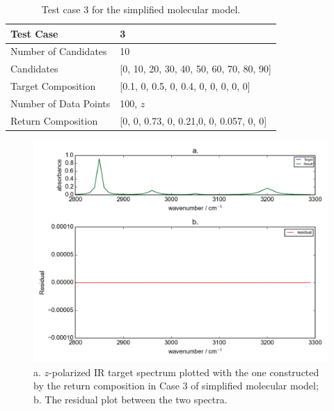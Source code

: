 \begin{table}[ht!]
\begin{center}
\begin{tabular}{| l | p{7cm} | }
\hline
Test Case & 3  \\
\hline
Number of Candidates & 10   \\
\hline
Candidates & [0, 10, 20, 30, 40, 50, 60, 70, 80, 90]  \\
\hline
Target Composition & [0.1, 0, 0.5, 0, 0.4, 0, 0, 0, 0, 0] \\
\hline
Number of Data Points & 100, $z$ \\
\hline
Return Composition & [0, 0, 0.73, 0, 0.21,0, 0, 0.057, 0, 0] \\
\hline
\end{tabular}
\end{center}
\caption{Test case 3 for the simplified molecular model.}
\label{tab:3.2}
\end{table}	

\begin{figure}[!ht] 
\centering
\includegraphics[scale=0.7]{Figures/toy_model_result_plotting_ir_cos_10candi_1.png} 
\caption{a. $z$-polarized IR target spectrum plotted with the one constructed by the return composition in Case 3 of simplified molecular model; b. The residual plot between the two spectra.}
\label{fig:3.3}
\end{figure}

